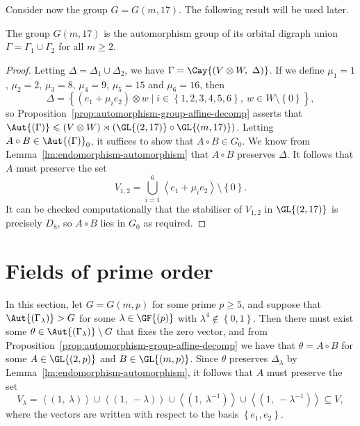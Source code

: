 Consider now the group $G = G{\left(m, 17 \right)}$. The following result will be used later.

\begin{theorem} \label{thm:q=17}
The group $G{\left(m, 17 \right)}$ is the automorphism group of its orbital digraph union $\Gamma = \Gamma_1 \cup \Gamma_2$ for all $m \geqslant 2$.
\end{theorem}
\begin{proof}
Letting $\Delta = \Delta_1 \cup \Delta_2$, we have $\Gamma = \Cay{\left(V \otimes W,\ \Delta \right)}$. If we define $\mu_1 = 1$, $\mu_2 = 2$, $\mu_3 = 8$, $\mu_4 = 9$, $\mu_5 = 15$ and $\mu_6 = 16$, then
\begin{displaymath}
    \Delta = {\left\{\left(e_1 + \mu_i e_2 \right) \otimes w \mid i \in {\left\{1, 2, 3, 4, 5, 6 \right\}},\ w \in W \setminus \left\{0 \right\}\right\}},
\end{displaymath}
so Proposition~\ref{prop:automorphism-group-affine-decomp} asserts that $\Aut{\left(\Gamma \right)} \leqslant \left(V \otimes W \right) \rtimes \left(\GL{\left(2, 17 \right)} \circ \GL{\left(m, 17 \right)}\right)$. Letting $A \circ B \in \Aut{\left(\Gamma \right)}_0$, it suffices to show that $A \circ B \in G_0$. We know from Lemma~\ref{lm:endomorphism-automorphism} that $A \circ B$ preserves $\Delta$. It follows that $A$ must preserve the set
\begin{displaymath}
    V_{1,2} = \bigcup_{i=1}^6 \left<e_1 + \mu_i e_2 \right> \setminus {\left\{0 \right\}}.
\end{displaymath}
It can be checked computationally that the stabiliser of $V_{1,2}$ in $\GL{\left(2, 17 \right)}$ is precisely $D_8$, so $A \circ B$ lies in $G_0$ as required.
\end{proof}

\section{Fields of prime order}

In this section, let $G = G{\left(m, p \right)}$ for some prime $p \geqslant 5$, and suppose that $\Aut{\left(\Gamma_\lambda \right)} > G$ for some $\lambda \in \GF{\left(p \right)}$ with $\lambda^4 \notin \left\{0, 1 \right\}$. Then there must exist some $\theta \in \Aut{\left(\Gamma_\lambda \right)} \setminus G$ that fixes the zero vector, and from Proposition~\ref{prop:automorphism-group-affine-decomp} we have that $\theta = A \circ B$ for some $A \in \GL{\left(2, p \right)}$ and $B \in \GL{\left(m, p \right)}$. Since $\theta$ preserves $\Delta_\lambda$ by Lemma~\ref{lm:endomorphism-automorphism}, it follows that $A$ must preserve the set
\begin{displaymath}
V_\lambda = \left<\left(1,\ \lambda \right)\right> \cup \left<\left(1,\ -\lambda \right)\right> \cup \left<\left(1,\ \lambda^{-1} \right)\right> \cup \left<\left(1,\ -\lambda^{-1} \right)\right> \subseteq V,
\end{displaymath}
where the vectors are written with respect to the basis $\left\{e_1, e_2 \right\}$.

